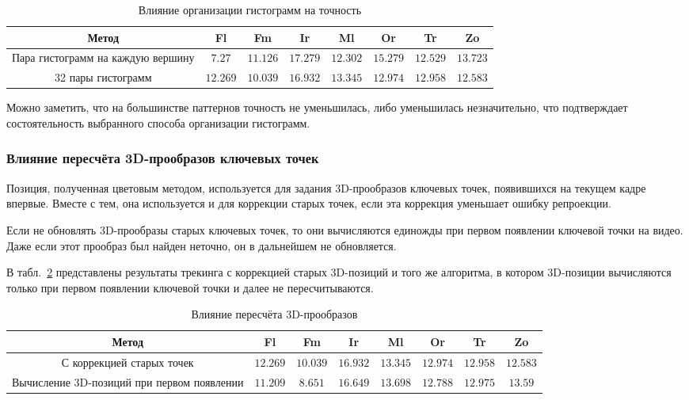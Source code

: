 \begin{table}[h]
\caption{\label{tab:full_hist}Влияние организации гистограмм на точность}
\begin{center}
\begin{tabular}{|c|c|c|c|c|c|c|c|}
\hline
Метод & Fl & Fm & Ir & Ml & Or & Tr & Zo \\
\hline
Пара гистограмм на каждую вершину & $7.27$ & $11.126$ & $17.279$ & $12.302$ &
$15.279$ & $12.529$ & $13.723$ \\
\hline
32 пары гистограмм & $12.269$ & $10.039$ & $16.932$ & $13.345$ & $12.974$ &
$12.958$
& $12.583$ \\
\hline
\end{tabular}
\end{center}
\end{table}

Можно заметить, что на большинстве паттернов точность не уменьшилась, либо
уменьшилась незначительно, что
подтверждает состоятельность выбранного способа организации гистограмм.


\subsubsection{Влияние пересчёта 3D-прообразов ключевых точек}

Позиция, полученная цветовым методом, используется для задания 3D-прообразов
ключевых точек, появившихся на текущем кадре впервые.
Вместе с тем, она используется и для коррекции старых точек, если эта коррекция
уменьшает ошибку репроекции.

Если не обновлять 3D-прообразы старых ключевых точек, то они вычисляются
единожды при первом появлении ключевой точки на видео.
Даже если этот прообраз был найден неточно, он в дальнейшем не обновляется.

В табл.~\ref{tab:reprojection} представлены результаты трекинга с коррекцией
старых 3D-позиций и того же алгоритма, в котором 3D-позиции вычисляются
только при первом появлении ключевой точки и далее не пересчитываются.

\begin{table}[h]
\caption{\label{tab:reprojection}Влияние пересчёта 3D-прообразов}
\begin{center}
\begin{tabular}{|c|c|c|c|c|c|c|c|}
\hline
Метод & Fl & Fm & Ir & Ml & Or & Tr & Zo \\
\hline
С коррекцией старых точек & $12.269$ & $10.039$ & $16.932$ & $13.345$ &
$12.974$ &
$12.958$ & $12.583$ \\
\hline
Вычисление 3D-позиций при первом появлении & $11.209$ & $8.651$ & $16.649$ &
$13.698$ & $12.788$ & $12.975$ &
$13.59$ \\
\hline
\end{tabular}
\end{center}
\end{table}

